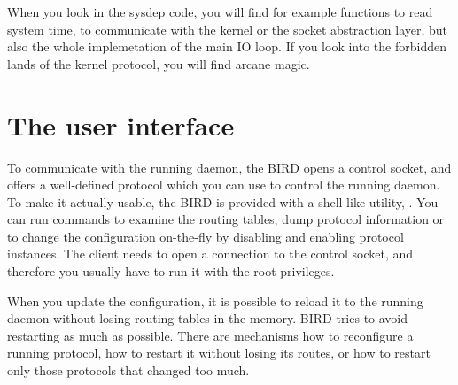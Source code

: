 When you look in the sysdep code, you will find for example functions to read
system time, to communicate with the kernel or the socket abstraction layer,
but also the whole implemetation of the main IO loop. If you look into the
forbidden lands of the kernel protocol, you will find arcane magic.

\section{The user interface}
To communicate with the running daemon, the BIRD opens a control socket, and offers
a well-defined protocol which you can use to control the running daemon. To
make it actually usable, the BIRD is provided with a shell-like utility,
. You can run commands to examine the routing tables, dump protocol
information or to change the configuration on-the-fly by disabling and enabling
protocol instances. The client needs to open a connection to the control
socket, and therefore you usually have to run it with the root privileges.

When you update the configuration, it is possible to reload it to the running
daemon without losing routing tables in the memory. BIRD tries to avoid
restarting as much as possible. There are mechanisms how to reconfigure
a running protocol, how to restart it without losing its routes, or how to
restart only those protocols that changed too much.
